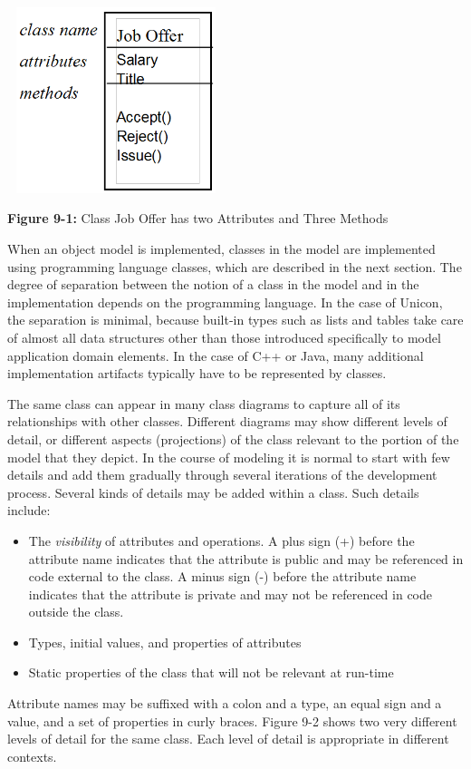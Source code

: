 \bigskip

\includegraphics[width=2.5in,height=2.1335in]{ub-img/umlclass.png} 

{\sffamily\bfseries Figure 9-1:}
{\sffamily Class Job Offer has two Attributes and Three Methods}

\bigskip

When an object model is implemented, classes in the model are
implemented using programming language classes, which are described in
the next section. The degree of separation between the notion of a
class in the model and in the implementation depends on the programming
language. In the case of Unicon, the separation is minimal, because
built-in types such as lists and tables take care of almost all data
structures other than those introduced specifically to model
application domain elements. In the case of C++ or Java,
many additional implementation artifacts typically have to be
represented by classes.

The same class can appear in many class diagrams to capture all of its
relationships with other classes. Different diagrams may show different
levels of detail, or different aspects (projections) of the class
relevant to the portion of the model that they depict. In the course of
modeling it is normal to start with few details and add them gradually
through several iterations of the development process. Several kinds of
details may be added within a class. Such details include:

\begin{itemize}
\item The \textit{visibility} of
attributes and operations. A plus sign (+) before the attribute name
indicates that the attribute is public and may be
referenced in code external to the class. A minus sign
(-) before the attribute name indicates that the attribute is
private and may not be referenced in code outside the
class.
\item Types, initial values, and properties of attributes
\item Static properties of the class that will not be relevant at
run-time
\end{itemize}
Attribute names may be suffixed with a colon and a type, an equal sign
and a value, and a set of properties in curly braces. Figure 9-2 shows
two very different levels of detail for the same class. Each level of
detail is appropriate in different contexts.

